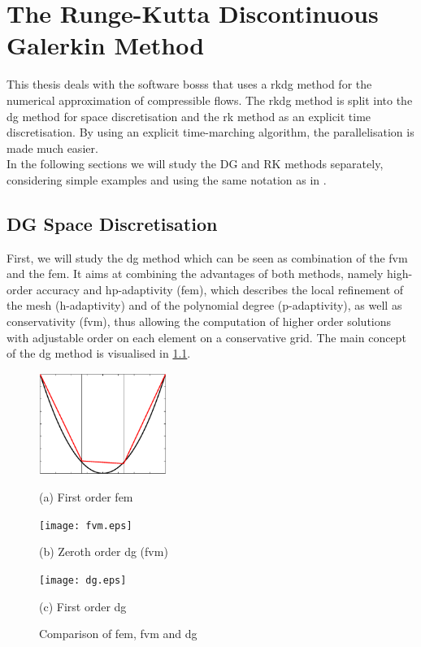\chapter{The Runge-Kutta Discontinuous Galerkin Method}
\label{rkdgm}
	This thesis deals with the software \gls{bosss} that uses a \gls{rkdg} method for the numerical approximation of compressible flows. The \gls{rkdg} method is split into the \gls{dg} method for space discretisation and the \gls{rk} method as an explicit time discretisation. By using an explicit time-marching algorithm, the parallelisation is made much easier. \\ \indent
	In the following sections we will study the DG and RK methods separately, considering simple examples and using the same notation as in \textcite{mueller2014}.
	\section{DG Space Discretisation}
		First, we will study the \gls{dg} method which can be seen as combination of the \gls{fvm} and the \gls{fem}. It aims at combining the advantages of both methods, namely high-order accuracy and hp-adaptivity (\gls{fem}), which describes the local refinement of the mesh (h-adaptivity) and of the polynomial degree (p-adaptivity), as well as conservativity (\gls{fvm}), thus allowing the computation of higher order solutions with adjustable order on each element on a conservative grid. The main concept of the \gls{dg} method is visualised in \cref{femfvm}.
		
		\begin{figure}[htp]
			\centering
			\begin{minipage}[b]{0.3\textwidth}
				\centering
				\includegraphics[height=3.3cm]{img/fem.eps}
				\caption*{(a) First order \gls{fem}}
			\end{minipage}
			\quad
			\begin{minipage}[b]{0.3\textwidth}
				\centering
				\texttt{[image: fvm.eps]}
				\caption*{(b) Zeroth order \gls{dg} (\gls{fvm})}
				\label{fig:case1afj4detail}
			\end{minipage}
			\quad
			\begin{minipage}[b]{0.3\textwidth}
				\centering
				\texttt{[image: dg.eps]}
				\caption*{(c) First order \gls{dg}}
				\label{femfafdavm}
			\end{minipage}
			\caption{Comparison of \gls{fem}, \gls{fvm} and \gls{dg}}
			\label{femfvm}
		\end{figure}

